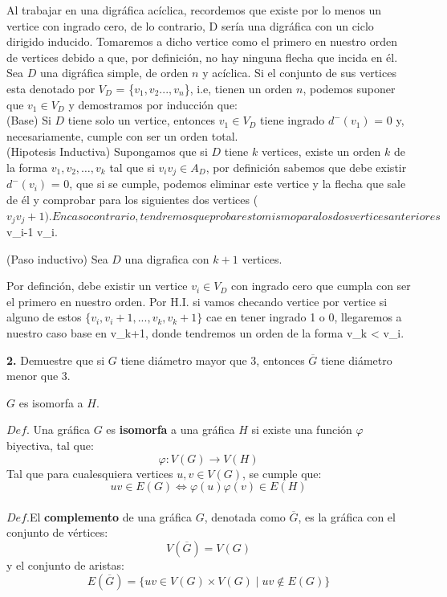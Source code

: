 \documentclass[12pt]{article}
\begin{document}
Al trabajar en una digráfica acíclica, recordemos que existe por lo menos un vertice con ingrado cero, 
de lo contrario, D sería una digráfica con un ciclo dirigido inducido. Tomaremos a dicho vertice como el primero en nuestro orden 
de vertices debido a que, por definición, no hay ninguna flecha que incida en él. \\

Sea $D$ una digráfica simple, de orden $n$ y acíclica. Si el conjunto de sus vertices esta denotado 
por $V_D$  = \{$v_1, v_2  . . . , v_n$\}, i.e, tienen un orden $n$, podemos suponer que  $v_1 \in V_D $
 y demostramos por inducción que:\\

(Base) Si $D$ tiene solo un vertice, entonces $v_1 \in V_D$ tiene ingrado $d^-(v_1)$ = 0 y, necesariamente, cumple con ser un orden total.\\

(Hipotesis Inductiva) Supongamos que si $D$ tiene $k$ vertices, existe un orden $k$ de la forma 
$v_1, v_2, \dots, v_k$ tal que si $v_i v_j \in A_D$, por definición sabemos que debe existir $d^-(v_i)$ = 0, que si se cumple, 
podemos eliminar este vertice y la flecha que sale de él y comprobar para los siguientes dos vertices ($v_j v_j+1). 
En caso contrario, tendremos que probar esto mismo para los dos vertices anteriores $v_i-1 v_i.

(Paso inductivo) Sea $D$ una digrafica con $k + 1$ vertices.

Por definción, debe existir un vertice $v_i \in V_D$ con ingrado cero que cumpla con ser el primero en nuestro orden. Por H.I.
si vamos checando vertice por vertice si alguno de estos $\{v_i, v_i+1, ..., v_k, v_k+1\}$ cae en tener ingrado 1 o 0, llegaremos a nuestro caso base en v_k+1,
donde tendremos un orden de la forma v_k < v_i. 



\vspace{1cm}

%
%
\textbf{2.} Demuestre que si $G$ tiene diámetro mayor que 3, entonces $\overline{G}$ tiene diámetro menor que 3.

\begin{tcolorbox}[title=\textbf{Hipotesis}, colback=red!15!white, colframe=black!, breakable]
    $G$ es isomorfa a $H$.
\end{tcolorbox}
\begin{tcolorbox}[title=\textbf{Definiciones}, colback=blue!15!white, colframe=black!, breakable]
    $Def$. Una gráfica $G$ es \textbf{isomorfa} a una gráfica $H$ si existe una función $\varphi$ biyectiva, tal que:
    \[\varphi: V(G) \rightarrow V(H)\]
    Tal que para cualesquiera vertices $u,v \in V(G)$, se cumple que:
    \[uv \in E(G) \Leftrightarrow \varphi(u)\varphi(v) \in E(H)\]
    \\
    $Def$.El \textbf{complemento} de una gráfica $G$, denotada como $\overline{G}$, es la gráfica con el conjunto de vértices:
    \[V(\overline{G}) = V(G)\]
    y el conjunto de aristas:
    \[E(\overline{G}) = \{ uv \in V(G) \times V(G) \mid uv \notin E(G)\}\]
\end{tcolorbox}
\end{document}
